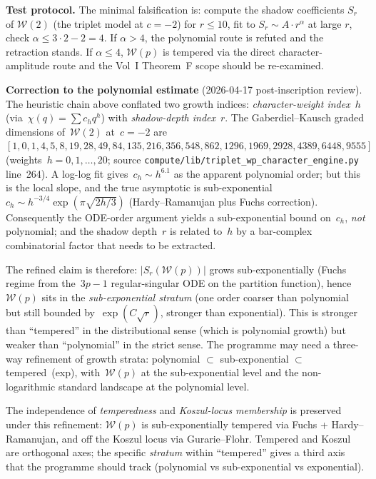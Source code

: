 \documentclass[11pt]{article}
\newcommand{\cW}{\mathcal{W}}
\begin{document}
\textbf{Test protocol.} The minimal falsification is: compute the
shadow coefficients $S_r$ of $\cW(2)$ (the triplet model at
$c = -2$) for $r \le 10$, fit to
$S_r \sim A \cdot r^{\alpha}$ at large $r$, check
$\alpha \le 3 \cdot 2 - 2 = 4$. If $\alpha > 4$, the polynomial
route is refuted and the retraction stands. If $\alpha \le 4$,
$\cW(p)$ is tempered via the direct character-amplitude route and
the Vol~I Theorem~F scope should be re-examined.

\textbf{Correction to the polynomial estimate}
(2026-04-17 post-inscription review). The heuristic chain above
conflated two growth indices:
\emph{character-weight index}~$h$ (via~$\chi(q) = \sum c_h q^h$) with
\emph{shadow-depth index}~$r$. The Gaberdiel--Kausch graded
dimensions of~$\cW(2)$ at~$c = -2$ are
$[1, 0, 1, 4, 5, 8, 19, 28, 49, 84, 135, 216, 356,
  548, 862, 1296, 1969, 2928, 4389, 6448, 9555]$
(weights~$h = 0, 1, \ldots, 20$; source
\verb|compute/lib/triplet_wp_character_engine.py| line~264). A
log-log fit gives~$c_h \sim h^{6.1}$ as the apparent
polynomial order; but this is the local
slope, and the true asymptotic is sub-exponential
$c_h \sim h^{-3/4}\exp(\pi\sqrt{2h/3})$ (Hardy--Ramanujan plus
Fuchs correction). Consequently the ODE-order argument yields a
sub-exponential bound on~$c_h$, \emph{not} polynomial; and the
shadow depth~$r$ is related to~$h$ by a bar-complex combinatorial
factor that needs to be extracted.

The refined claim is therefore: $|S_r(\cW(p))|$ grows
sub-exponentially (Fuchs regime from the~$3p-1$ regular-singular
ODE on the partition function), hence~$\cW(p)$ sits in the
\emph{sub-exponential stratum} (one order coarser than polynomial
but still bounded by~$\exp(C\sqrt r)$, stronger than exponential).
This is stronger than ``tempered'' in the distributional sense
(which is polynomial growth) but weaker than ``polynomial'' in the
strict sense. The programme may need a three-way refinement of
growth strata: polynomial $\subset$ sub-exponential $\subset$
tempered~(exp), with~$\cW(p)$ at the sub-exponential level and the
non-logarithmic standard landscape at the polynomial level.

The independence of \emph{temperedness} and
\emph{Koszul-locus membership} is preserved under this refinement:
$\cW(p)$ is sub-exponentially tempered via Fuchs + Hardy--Ramanujan,
and off the Koszul locus via Gurarie--Flohr. Tempered and Koszul are
orthogonal axes; the specific \emph{stratum} within ``tempered''
gives a third axis that the programme should track (polynomial vs
sub-exponential vs exponential).
\end{document}
